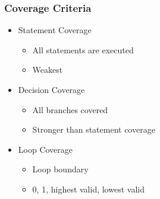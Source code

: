 \begin{frame}
    \frametitle{Coverage Criteria}
    \begin{itemize}
        \item Statement Coverage
            \begin{itemize}
                \item All statements are executed
                \item Weakest
            \end{itemize}
        \item Decision Coverage
            \begin{itemize}
                \item All branches covered
                \item Stronger than statement coverage
            \end{itemize}
        \item Loop Coverage
            \begin{itemize}
                \item Loop boundary
                \item 0, 1, highest valid, lowest valid
            \end{itemize}
    \end{itemize}
\end{frame}


